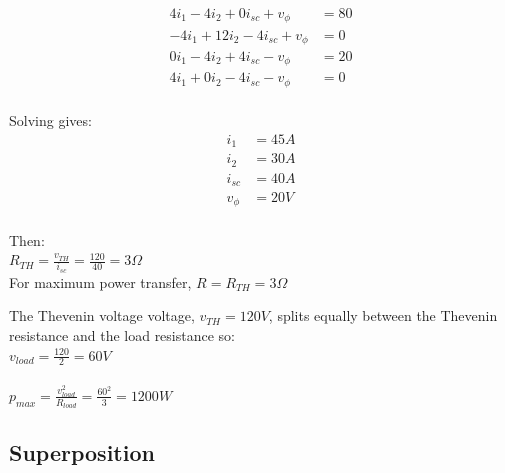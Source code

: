 \begin{align*}
	4i_1 - 4i_2 + 0i_{sc} + v_{\phi} &= 80 \\
	-4i_1 +12i_2 - 4i_{sc} + v_{\phi} &= 0 \\
	0i_1 - 4i_2 + 4i_{sc} - v_{\phi} &= 20 \\
	4i_1 + 0i_2 - 4i_{sc} - v_{\phi} &= 0 \\
\end{align*}

Solving gives:
\begin{align*}
	i_1 &= 45 A \\
	i_2 &= 30 A \\
	i_{sc} &= 40 A \\
	v_{\phi} &= 20 V \\
\end{align*}

Then: \\
$ R_{TH} = \frac{v_{TH}}{i_{sc}} = \frac{120}{40} = 3 \Omega $\\

For maximum power transfer, $R = R_{TH} = 3\Omega $  

The Thevenin voltage voltage, $v_{TH} = 120 V$, splits equally between the Thevenin resistance
and the load resistance so: 
\\ $v_{load} = \frac{120}{2} = 60 V $ \\
\\ $p_{max} = \frac{v^2_{load}}{R_{load}} = \frac{60^2}{3} = 1200 W $ \\

\subsection {Superposition}



